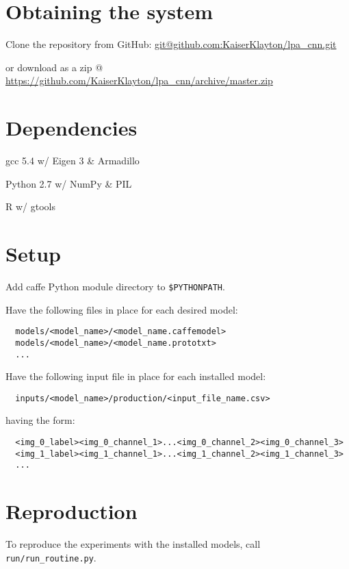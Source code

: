 \documentclass[]{article}
\date{}
\begin{document}
\section{Obtaining the system}\label{Obtaining the system}

Clone the repository from GitHub: \url{git@github.com:KaiserKlayton/lpa\_cnn.git}

or download as a zip @ \url{https://github.com/KaiserKlayton/lpa_cnn/archive/master.zip}

\section{Dependencies}\label{dependencies}

gcc 5.4 w/ Eigen 3 \& Armadillo

Python 2.7 w/ NumPy \& PIL

R w/ gtools

\section{Setup}\label{setup}

Add caffe Python module directory to \texttt{\$PYTHONPATH}.

Have the following files in place for each desired model:

\begin{verbatim}
  models/<model_name>/<model_name.caffemodel>
  models/<model_name>/<model_name.prototxt>
  ...
\end{verbatim}

Have the following input file in place for each installed model:

\begin{verbatim}
  inputs/<model_name>/production/<input_file_name.csv>
\end{verbatim}

having the form:

\begin{verbatim}
  <img_0_label><img_0_channel_1>...<img_0_channel_2><img_0_channel_3>
  <img_1_label><img_1_channel_1>...<img_1_channel_2><img_1_channel_3>
  ...
\end{verbatim}

\section{Reproduction}\label{reproduction}

To reproduce the experiments with the installed models, call
\texttt{run/run\_routine.py}.
\end{document}
